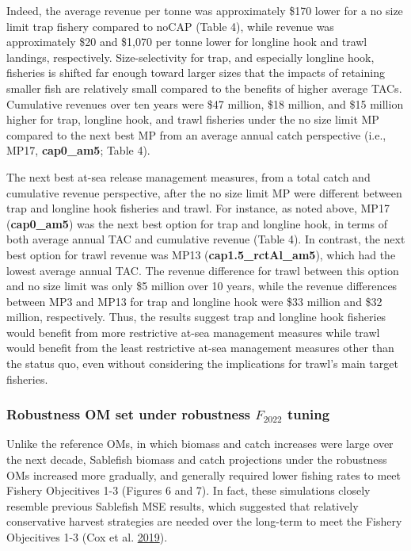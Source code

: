 \documentclass[11pt]{book}
\begin{document}
Indeed, the average revenue per tonne was approximately \$170 lower for a no size limit trap fishery compared to noCAP (Table 4), while revenue was approximately \$20 and \$1,070 per tonne lower for longline hook and trawl landings, respectively. Size-selectivity for trap, and especially longline hook, fisheries is shifted far enough toward larger sizes that the impacts of retaining smaller fish are relatively small compared to the benefits of higher average TACs. Cumulative revenues over ten years were \$47 million, \$18 million, and \$15 million higher for trap, longline hook, and trawl fisheries under the no size limit MP compared to the next best MP from an average annual catch perspective (i.e., MP17, \textbf{cap0\_am5}; Table 4).

The next best at-sea release management measures, from a total catch and cumulative revenue perspective, after the no size limit MP were different between trap and longline hook fisheries and trawl. For instance, as noted above, MP17 (\textbf{cap0\_am5}) was the next best option for trap and longline hook, in terms of both average annual TAC and cumulative revenue (Table 4). In contrast, the next best option for trawl revenue was MP13 (\textbf{cap1.5\_rctAl\_am5}), which had the lowest average annual TAC. The revenue difference for trawl between this option and no size limit was only \$5 million over 10 years, while the revenue differences between MP3 and MP13 for trap and longline hook were \$33 million and \$32 million, respectively. Thus, the results suggest trap and longline hook fisheries would benefit from more restrictive at-sea management measures while trawl would benefit from the least restrictive at-sea management measures other than the status quo, even without considering the implications for trawl's main target fisheries.

\hypertarget{robustness-om-set-under-robustness-f_2022-tuning}{%
\subsubsection{\texorpdfstring{Robustness OM set under robustness \(F_{2022}\) tuning}{Robustness OM set under robustness F\_\{2022\} tuning}}\label{robustness-om-set-under-robustness-f_2022-tuning}}

Unlike the reference OMs, in which biomass and catch increases were large over the next decade, Sablefish biomass and catch projections under the robustness OMs increased more gradually, and generally required lower fishing rates to meet Fishery Objecitives 1-3 (Figures 6 and 7). In fact, these simulations closely resemble previous Sablefish MSE results, which suggested that relatively conservative harvest strategies are needed over the long-term to meet the Fishery Objecitives 1-3 (Cox et al. \protect\hyperlink{ref-cox2019evaluating}{2019}).
\end{document}
